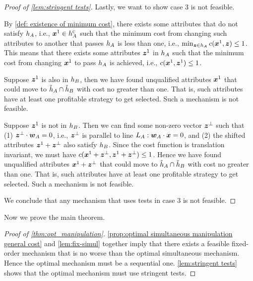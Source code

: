 \begin{proof}[Proof of \cref{lem:stringent tests}]
    Lastly, we want to show case 3 is not feasible. 
    
    By \cref{def: existence of minimum cost}, 
    there exists some attributes that do not satisfy $h_A$, i.e., $\boldsymbol{x}^1\in h_A^{\textsc{c}}$ such that the minimum cost from changing such attributes to another that passes $h_A$ is less than one, i.e.,  $\min_{\boldsymbol{z}\in h_A}c(\boldsymbol{x}^1,\boldsymbol{z})\leq 1$.
     This means that there exists some attributes $\boldsymbol{z}^1$ in $h_A$  such that the minimum cost from changing $\boldsymbol{x}^1$ to  pass $h_A$ is achieved, i.e., $c(\boldsymbol{x}^1,\boldsymbol{z}^1)\leq 1$. 
     
     Suppose $\boldsymbol{z}^1$ is also in $h_B$, then we have found unqualified attributes $\boldsymbol{x}^1$ that could move to  $\tilde{h}_A\cap \tilde{h}_B$ with cost no greater than one.
     That is, such attributes have at least one profitable strategy to get selected.
     Such a mechanism is not feasible. 

Suppose $\boldsymbol{z}^1$ is not in $h_B$.
Then we can find some non-zero vector $\boldsymbol{z}^\perp$ such that (1) $\boldsymbol{z}^\perp\cdot \boldsymbol{w}_A=0$, i.e., $\boldsymbol{z}^\perp$ is parallel to line $L_A: \boldsymbol{w}_A\cdot \boldsymbol{x} =0$, and (2) the shifted attributes $\boldsymbol{z}^1+\boldsymbol{z}^\perp$ also satisfy $h_B$.
    Since the cost function is translation invariant, we must have $c(\boldsymbol{x}^1+\boldsymbol{z}^\perp,\boldsymbol{z}^1+\boldsymbol{z}^\perp)\leq 1$.
    Hence we have found unqualified attributes $\boldsymbol{x}^1+\boldsymbol{z}^\perp$ that could move to  $\tilde{h}_A\cap \tilde{h}_B$ with cost no greater than one.
     That is, such attributes have at least one profitable strategy to get selected.
     Such a mechanism is not feasible.
     
     We conclude that any mechanism that uses tests in case 3 is not feasible. 
    
\end{proof}



Now we prove the main theorem.
\begin{proof}[Proof of \cref{thm:opt_manipulation}]
   

    \cref{prop:optimal simultaneous manipulation general cost} and  \cref{lem:fix-simul} together imply that there exists a feasible fixed-order mechanism that is no worse than the optimal simultaneous mechanism. Hence the optimal mechanism must be a sequential one.
    \cref{lem:stringent tests} shows that the optimal mechanism must use stringent tests.
\end{proof}

